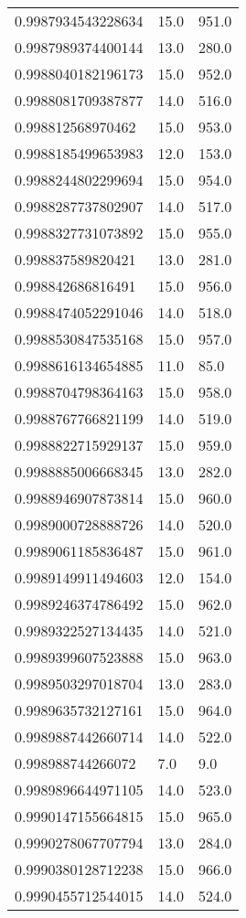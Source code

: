 \begin{center}
\begin{supertabular}[H]{p{0.30\textwidth}p{0.05\textwidth}p{0.05\textwidth}}
0.9987934543228634 & 15.0 & 951.0 \\ 
0.9987989374400144 & 13.0 & 280.0 \\ 
0.9988040182196173 & 15.0 & 952.0 \\ 
0.9988081709387877 & 14.0 & 516.0 \\ 
0.998812568970462 & 15.0 & 953.0 \\ 
0.9988185499653983 & 12.0 & 153.0 \\ 
0.9988244802299694 & 15.0 & 954.0 \\ 
0.9988287737802907 & 14.0 & 517.0 \\ 
0.9988327731073892 & 15.0 & 955.0 \\ 
0.998837589820421 & 13.0 & 281.0 \\ 
0.998842686816491 & 15.0 & 956.0 \\ 
0.9988474052291046 & 14.0 & 518.0 \\ 
0.9988530847535168 & 15.0 & 957.0 \\ 
0.9988616134654885 & 11.0 & 85.0 \\ 
0.9988704798364163 & 15.0 & 958.0 \\ 
0.9988767766821199 & 14.0 & 519.0 \\ 
0.9988822715929137 & 15.0 & 959.0 \\ 
0.9988885006668345 & 13.0 & 282.0 \\ 
0.9988946907873814 & 15.0 & 960.0 \\ 
0.9989000728888726 & 14.0 & 520.0 \\ 
0.9989061185836487 & 15.0 & 961.0 \\ 
0.9989149911494603 & 12.0 & 154.0 \\ 
0.9989246374786492 & 15.0 & 962.0 \\ 
0.9989322527134435 & 14.0 & 521.0 \\ 
0.9989399607523888 & 15.0 & 963.0 \\ 
0.9989503297018704 & 13.0 & 283.0 \\ 
0.9989635732127161 & 15.0 & 964.0 \\ 
0.9989887442660714 & 14.0 & 522.0 \\ 
0.998988744266072 & 7.0 & 9.0 \\ 
0.9989896644971105 & 14.0 & 523.0 \\ 
0.9990147155664815 & 15.0 & 965.0 \\ 
0.9990278067707794 & 13.0 & 284.0 \\ 
0.9990380128712238 & 15.0 & 966.0 \\ 
0.9990455712544015 & 14.0 & 524.0 \\ 

\end{supertabular}
\end{center}
